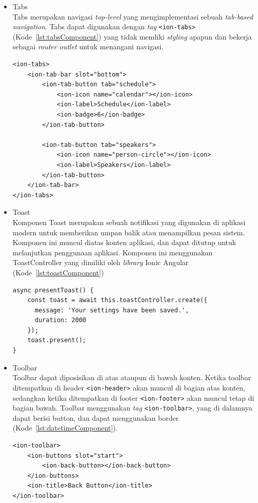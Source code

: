 \begin{itemize}
	\item Tabs \\
	Tabs merupakan navigasi {\it top-level} yang mengimplementasi sebuah {\it tab-based navigation}. Tabs dapat digunakan dengan {\it tag} \texttt{<ion-tabs>} (Kode~\ref{lst:tabsComponent}) yang tidak memliki {\it styling} apapun dan bekerja sebagai {\it router outlet} untuk menangani navigasi. 
		\begin{lstlisting}[label={lst:tabsComponent}, caption=Kode Program dari Tabs]
<ion-tabs>
	<ion-tab-bar slot="bottom">
		<ion-tab-button tab="schedule">
			<ion-icon name="calendar"></ion-icon>
			<ion-label>Schedule</ion-label>
			<ion-badge>6</ion-badge>
		</ion-tab-button>

		<ion-tab-button tab="speakers">
			<ion-icon name="person-circle"></ion-icon>
			<ion-label>Speakers</ion-label>
		</ion-tab-button>
	</ion-tab-bar>
</ion-tabs>
		\end{lstlisting}
		
	\item Toast \\
	Komponen Toast merupakan sebuah notifikasi yang digunakan di aplikasi modern untuk memberikan umpan balik atau menampilkan pesan sistem. Komponen ini muncul diatas konten aplikasi, dan dapat ditutup untuk melanjutkan penggunaan aplikasi. Komponen ini menggunakan ToastController yang dimiliki oleh \textit{library} Ionic Angular (Kode~\ref{lst:toastComponent}) 
	
	\begin{lstlisting}[label={lst:toastComponent}, caption=Kode Program dari Toast]
async presentToast() {
    const toast = await this.toastController.create({
      message: 'Your settings have been saved.',
      duration: 2000
    });
    toast.present();
}
		\end{lstlisting}
		

	\item Toolbar \\
	Toolbar dapat diposisikan di atas ataupun di bawah konten. Ketika toolbar ditempatkan di header \texttt{<ion-header>} akan muncul di bagian atas konten, sedangkan ketika ditempatkan di footer \texttt{<ion-footer>} akan muncul tetap di bagian bawah. Toolbar menggunakan {\it tag} \texttt{<ion-toolbar>}, yang di dalamnya dapat berisi button, dan dapat menggunakan border (Kode~\ref{lst:datetimeComponent}).

		\begin{lstlisting}[label={lst:datetimeComponent}, caption=Kode Program dari Toolbar dengan Button di Dalamnya]
<ion-toolbar>
	<ion-buttons slot="start">
		<ion-back-button></ion-back-button>
	</ion-buttons>
	<ion-title>Back Button</ion-title>
</ion-toolbar>
		\end{lstlisting} 
\end{itemize}
